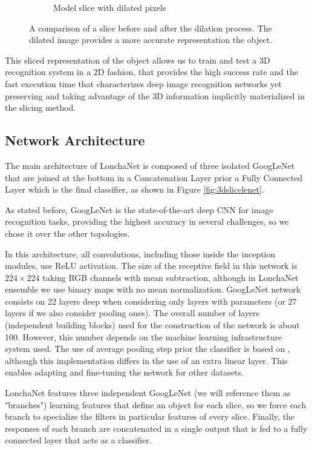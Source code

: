 \begin{figure}[!t]
\begin{subfigure}[t]{0.35\linewidth}
        \caption{Model slice with dilated pixels}
        \label{fig:dilation_b}
    \end{subfigure}
    \caption{A comparison of a slice before and after the dilation process. The dilated image provides a more accurate representation the object.}
    \label{fig:objrecog:dilation}
\end{figure}

This sliced representation of the object allows us to train and test a 3D recognition system in a 2D fashion, that provides the high success rate and the fast execution time that characterizes deep image recognition networks yet preserving and taking advantage of the 3D information implicitly materialized in the slicing method.

\subsection{Network Architecture}
\label{cha:objrecog:sec:lonchanet:subsec:architecture}

The main architecture of LonchaNet is composed of three isolated GoogLeNet that are joined at the bottom in a Concatenation Layer prior a Fully Connected Layer which is the final classifier, as shown in Figure \ref{fig:3dslicelenet}.

As stated before, GoogLeNet is the state-of-the-art deep \acl{CNN} for image recognition tasks, providing the highest accuracy in several challenges, so we chose it over the other topologies.

In this architecture, all convolutions, including those inside the inception modules, use \ac{ReLU} activation.
The size of the receptive field in this network is $224 \times 224$ taking RGB  channels with mean subtraction, although in  LonchaNet ensemble we use binary maps with no mean normalization.
GoogLeNet network consists on 22 layers deep when considering only layers with
parameters (or 27 layers if we also consider pooling ones). The overall number of layers (independent building blocks) used for the construction of the network is about 100. However, this number depends on the machine learning infrastructure system used. The use of average pooling step prior the classifier is
based on \cite{Lin2013}, although this implementation differs in the  use of an extra linear layer. This enables adapting and fine-tuning the network for other datasets.

LonchaNet features three independent GoogLeNet (we will reference them as "branches") learning features that define an object for each slice, so we force each branch to specialize the filters in  particular features of every slice. Finally, the responses of each branch are concatenated in a single output that is fed to a fully connected layer that acts as a classifier.

